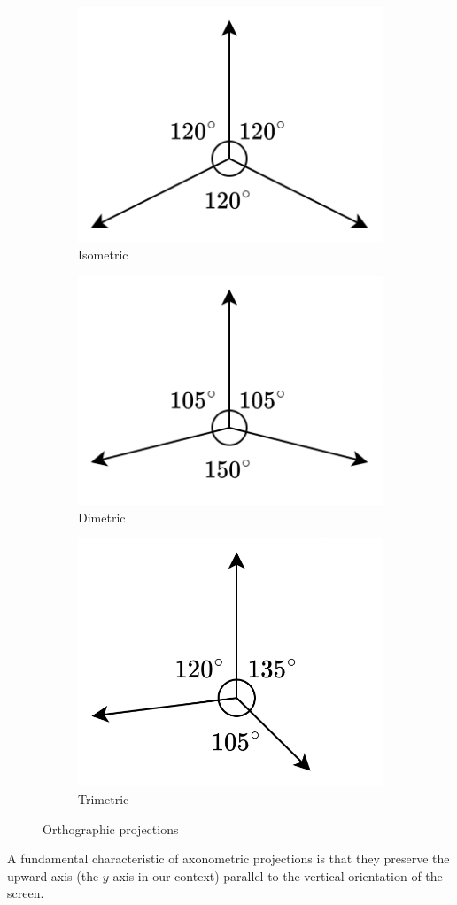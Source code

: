 \begin{figure}[H]
    \centering
    \begin{subfigure}{0.32\textwidth}
        \centering
        \includegraphics[width=0.75\linewidth]{images/iso.png} 
        \caption{Isometric}
    \end{subfigure}
    \begin{subfigure}{0.32\textwidth}
        \centering
        \includegraphics[width=0.75\linewidth]{images/dim.png}
        \caption{Dimetric}
    \end{subfigure}
    \begin{subfigure}{0.32\textwidth}
        \centering
        \includegraphics[width=0.75\linewidth]{images/tri.png} 
        \caption{Trimetric}
    \end{subfigure}
    \caption{Orthographic projections}
\end{figure}
A fundamental characteristic of axonometric projections is that they preserve the upward axis (the $y$-axis in our context) parallel to the vertical orientation of the screen.

